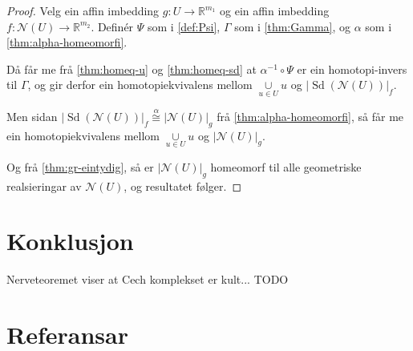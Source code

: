 \documentclass[a4paper, 12pt, norsk]{article}
\theoremstyle{plain}
\theoremstyle{definition}
\newcommand{\Rb}{\mathbb{R}}
\newcommand{\Nc}{\mathcal{N}}
\newcommand{\union}{ \mathop{\cup}\limits }
\newcommand{\gr}[1]{ \lvert #1 \rvert } %
\DeclareMathOperator{\Sd}{Sd}
\begin{document}
\begin{proof}
	Velg ein affin imbedding \( g: U \to \Rb^{m_1} \) og ein affin imbedding \( f: \Nc(U) \to \Rb^{m_2} \). Definér \( \Psi \) som i \autoref{def:Psi}, \( \Gamma \) som i \autoref{thm:Gamma}, og \( \alpha \) som i \autoref{thm:alpha-homeomorfi}.

	Då får me frå \autoref{thm:homeq-u} og \autoref{thm:homeq-sd} at \( \alpha^{-1} \circ \Psi \) er ein homotopi-invers til \( \Gamma \), og gir derfor ein homotopiekvivalens mellom \( \union_{u \in U} u \) og \( \gr{\Sd(\Nc(U))}_f \).

	Men sidan \( \gr{\Sd(\Nc(U))}_f \stackrel{\alpha}{\cong} \gr{\Nc(U)}_g \) frå \autoref{thm:alpha-homeomorfi}, så får me ein homotopiekvivalens mellom \( \union_{u \in U} u \) og \( \gr{\Nc(U)}_g \).

	Og frå \autoref{thm:gr-eintydig}, så er \( \gr{\Nc(U)}_g \) homeomorf til alle geometriske realsieringar av \( \Nc(U) \), og resultatet følger.
\end{proof}

\section{Konklusjon}

Nerveteoremet viser at Cech komplekset er kult... TODO

\section{Referansar}

{}

\end{document}
